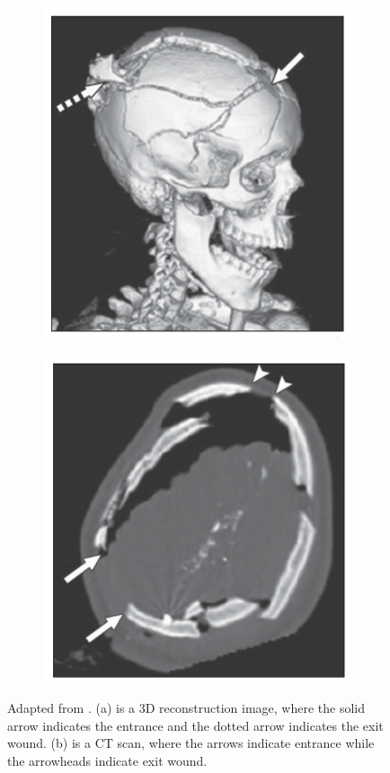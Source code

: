 \documentclass[titlepage]{article}
\begin{document}
\begin{figure}[h!]
\centering
\begin{subfigure}{.5\textwidth}
  \centering
  \includegraphics[width=.7\linewidth]{gunshot1}
  \end{subfigure}%
\begin{subfigure}{.5\textwidth}
  \centering
  \includegraphics[width=.7\linewidth]{gunshot2}
\end{subfigure}
\caption{Adapted from \cite{ballistic-trauma}. (a) is a 3D reconstruction image, where the solid arrow indicates the entrance and the dotted arrow indicates the exit wound. (b) is a CT scan, where the arrows indicate entrance while the arrowheads indicate exit wound.}
\label{fig:gunshot}
\end{figure}
\end{document}

